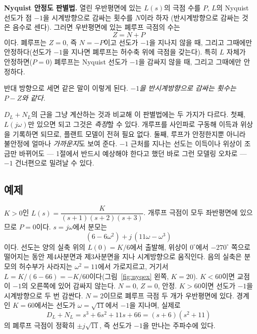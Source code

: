 \documentclass[11pt]{article}
\begin{document}
\begin{keybox}
\textbf{Nyquist 안정도 판별법.} 열린 우반평면에 있는 $L(s)$의 극점 수를 $P$,
$L$의 Nyquist 선도가 점 $-1$을 시계방향으로 감싸는 횟수를 $N$이라 하자
(반시계방향으로 감싸는 것은 음수로 센다). 그러면 우반평면에 있는 폐루프 극점의
수는
\[
   Z = N + P
\]
이다. 폐루프는 $Z=0$, 즉 $N=-P$이고 선도가 $-1$을 지나지 않을 때, 그리고
그때에만 안정하다(선도가 $-1$을 지나면 폐루프는 허수축 위에 극점을 갖는다).
특히 $L$ 자체가 안정하면($P=0$) 폐루프는 Nyquist 선도가 $-1$을 감싸지 않을 때,
그리고 그때에만 안정하다.

\smallskip\noindent
반대 방향으로 세면 같은 말이 이렇게 된다. \emph{$-1$을 반시계방향으로 감싸는
횟수는 $P-Z$와 같다.}
\end{keybox}

\begin{remark}
$D_L+N_L$의 근을 그냥 계산하는 것과 비교해 이 판별법에는 두 가지가 다르다.
첫째, $L(j\omega)$만 있으면 되고 그것은 \emph{측정}할 수 있다. 개루프를
사인파로 구동해 이득과 위상을 기록하면 되므로, 플랜트 모델이 전혀 필요 없다.
둘째, 루프가 안정한지뿐 아니라 불안정에 얼마나 \emph{가까운지}도 보여 준다.
$-1$ 근처를 지나는 선도는 이득이나 위상이 조금만 바뀌어도 --- 1절에서 반드시
예상해야 한다고 했던 바로 그런 모델링 오차로 --- $-1$ 건너편으로 밀려날 수 있다.
\end{remark}

\subsection{예제}
\begin{example}\label{ex:nyq1}
$K>0$인 $L(s)=\dfrac{K}{(s+1)(s+2)(s+3)}$. 개루프 극점이 모두 좌반평면에 있으므로
$P=0$이다. $s=j\omega$에서 분모는
\[
   (6-6\omega^{2}) + j\,(11\omega-\omega^{3})
\]
이다. 선도는 양의 실축 위의 $L(0)=K/6$에서 출발해, 위상이 $0^\circ$에서
$-270^\circ$ 쪽으로 떨어지는 동안 제4사분면과 제3사분면을 지나 시계방향으로
움직인다. 음의 실축은 분모의 허수부가 사라지는 $\omega^{2}=11$에서 가로지르고,
거기서 $L=K/(6-66)=-K/60$이다(그림~\ref{fig:nyqex} 왼쪽, $K=20$). $K<60$이면
교점이 $-1$의 오른쪽에 있어 감싸지 않는다. $N=0$, $Z=0$, 안정. $K>60$이면 선도가
$-1$을 시계방향으로 두 번 감싼다. $N=2$이므로 폐루프 극점 두 개가 우반평면에
있다. 경계인 $K=60$에서는 선도가 $\omega=\sqrt{11}$에서 $-1$을 지나며, 실제로
\[
   D_L+N_L = s^{3}+6s^{2}+11s+66 = (s+6)(s^{2}+11)
\]
의 폐루프 극점이 정확히 $\pm j\sqrt{11}$, 즉 선도가 $-1$을 만나는 주파수에 있다.
\end{example}
\end{document}
